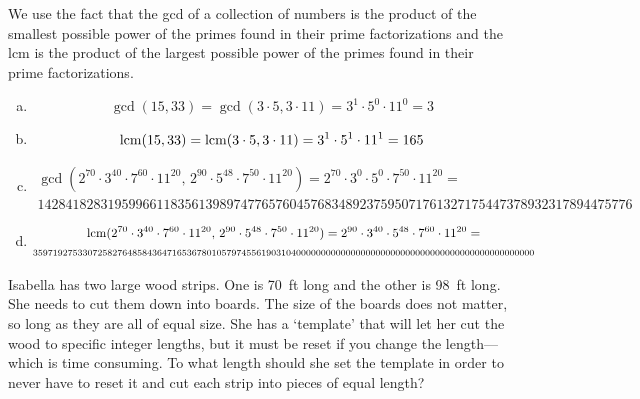 \documentclass[11pt,letterpaper]{article}
\begin{document}
\sol We use the fact that the gcd of a collection of numbers is the product of the smallest possible power of the primes found in their prime factorizations and the lcm is the product of the largest possible power of the primes found in their prime factorizations. 
\begin{enumerate}[(a)]
\item 
	\[
	\gcd(15, 33)= \gcd(3 \cdot 5, 3 \cdot 11)= 3^1 \cdot 5^0 \cdot 11^0= 3
	\] \pspace

\item 
	\[
	\operatorname{lcm}(15, 33)= \operatorname{lcm}(3 \cdot 5, 3 \cdot 11)= 3^1 \cdot 5^1 \cdot 11^1= 165
	\] \pspace

\item 
	\[
	\begin{gathered}
	\gcd(2^{70} \cdot 3^{40} \cdot 7^{60} \cdot 11^{20},\, 2^{90} \cdot 5^{48} \cdot 7^{50} \cdot 11^{20})= 2^{70} \cdot 3^0 \cdot 5^0 \cdot 7^{50} \cdot 11^{20}= \\[0.3cm]
1428418283195996611835613989747765760457683489237595071761327175447378932317894475776
	\end{gathered}
	\] \pspace

\item 
	\[
	\begin{gathered}
	\operatorname{lcm}(2^{70} \cdot 3^{40} \cdot 7^{60} \cdot 11^{20},\, 2^{90} \cdot 5^{48} \cdot 7^{50} \cdot 11^{20})= 2^{90} \cdot 3^{40} \cdot 5^{48} \cdot 7^{60} \cdot 11^{20}= \\ {\scriptstyle 35971927533072582764858436471653678010579745561903104000000000000000000000000000000000000000000000000}
	\end{gathered}
	\] \pspace
\end{enumerate}



\newpage



 Isabella has two large wood strips. One is 70~ft long and the other is 98~ft long. She needs to cut them down into boards. The size of the boards does not matter, so long as they are all of equal size. She has a `template' that will let her cut the wood to specific integer lengths, but it must be reset if you change the length---which is time consuming. To what length should she set the template in order to never have to reset it and cut each strip into pieces of equal length? \pspace
\end{document}

